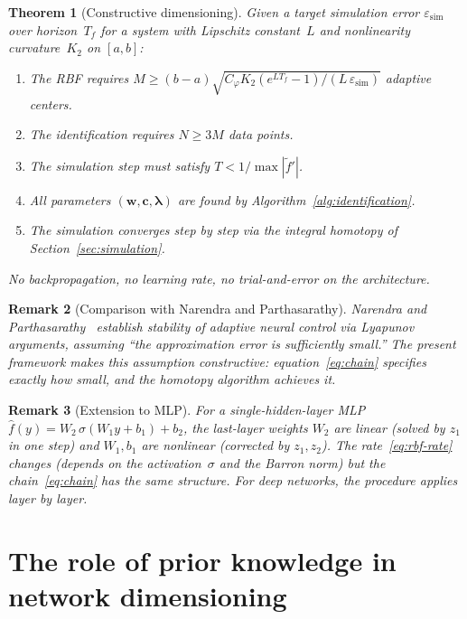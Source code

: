 \documentclass[11pt,a4paper]{article}
\newtheorem{theorem}{Theorem}
\newtheorem{remark}[theorem]{Remark}
\begin{document}
\begin{theorem}[Constructive dimensioning]\label{thm:dimensioning}
Given a target simulation error $\varepsilon_{\mathrm{sim}}$ over horizon~$T_f$ for a system with Lipschitz constant~$L$ and nonlinearity curvature~$K_2$ on $[a,b]$:
\begin{enumerate}[nosep]
\item[\emph{(i)}] The RBF requires $M \geq (b-a)\sqrt{C_\varphi K_2 (e^{LT_f}-1) / (L\,\varepsilon_{\mathrm{sim}})}$ adaptive centers.
\item[\emph{(ii)}] The identification requires $N \geq 3M$ data points.
\item[\emph{(iii)}] The simulation step must satisfy $T < 1/\max|\tilde{f}'|$.
\item[\emph{(iv)}] All parameters $(\mathbf{w}, \mathbf{c}, \boldsymbol{\lambda})$ are found by Algorithm~\ref{alg:identification}.
\item[\emph{(v)}] The simulation converges step by step via the integral homotopy of Section~\ref{sec:simulation}.
\end{enumerate}
No backpropagation, no learning rate, no trial-and-error on the architecture.
\end{theorem}

\begin{remark}[Comparison with Narendra and Parthasarathy]
Narendra and Parthasarathy~\cite{Narendra1990} establish stability of adaptive neural control via Lyapunov arguments, assuming ``the approximation error is sufficiently small.'' The present framework makes this assumption constructive: equation~\eqref{eq:chain} specifies exactly how small, and the homotopy algorithm achieves it.
\end{remark}

\begin{remark}[Extension to MLP]
For a single-hidden-layer MLP $\hat{f}(y) = W_2\,\sigma(W_1 y + b_1) + b_2$, the last-layer weights $W_2$ are linear (solved by $z_1$ in one step) and $W_1, b_1$ are nonlinear (corrected by $z_1, z_2$). The rate~\eqref{eq:rbf-rate} changes (depends on the activation~$\sigma$ and the Barron norm) but the chain~\eqref{eq:chain} has the same structure. For deep networks, the procedure applies layer by layer.
\end{remark}



\section{The role of prior knowledge in network dimensioning}
\label{sec:prior}
\end{document}
